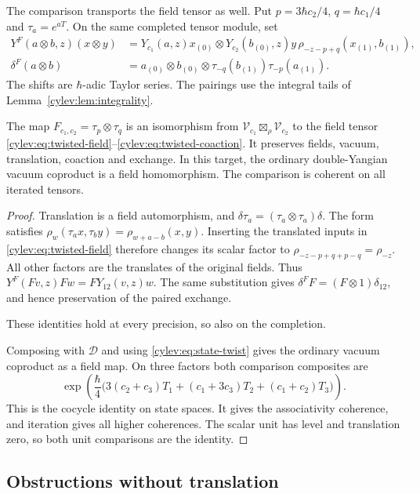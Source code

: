 The comparison transports the field tensor as well.
Put $p=3\hbar c_2/4$, $q=\hbar c_1/4$ and $\tau_a=e^{aT}$.
On the same completed tensor module, set
\begin{align}
 Y^F(a\otimes b,z)(x\otimes y)
 &=Y_{c_1}(a,z)x_{(0)}\otimes Y_{c_2}(b_{(0)},z)y\,
       \rho_{-z-p+q}(x_{(1)},b_{(1)}),\label{cylev:eq:twisted-field}\\
 \delta^F(a\otimes b)
 &=a_{(0)}\otimes b_{(0)}\otimes
          \tau_{-q}(b_{(1)})\tau_{-p}(a_{(1)}).
       \label{cylev:eq:twisted-coaction}
\end{align}
The shifts are $\hbar$-adic Taylor series.
The pairings use the integral tails of Lemma~\ref{cylev:lem:integrality}.

\begin{proposition}\label{cylev:prop:transported-tensor}
The map $F_{c_1,c_2}=\tau_p\otimes\tau_q$ is an isomorphism
from $\mathcal V_{c_1}\boxtimes_\rho\mathcal V_{c_2}$ to the
field tensor \eqref{cylev:eq:twisted-field}--\eqref{cylev:eq:twisted-coaction}.
It preserves fields, vacuum, translation, coaction and exchange.
In this target, the ordinary double-Yangian vacuum coproduct is a
field homomorphism. The comparison is coherent on all iterated tensors.
\end{proposition}
\begin{proof}
Translation is a field automorphism, and
$\delta\tau_a=(\tau_a\otimes\tau_a)\delta$.
The form satisfies
$\rho_w(\tau_a x,\tau_b y)=\rho_{w+a-b}(x,y)$.
Inserting the translated inputs in \eqref{cylev:eq:twisted-field}
therefore changes its scalar factor to
$\rho_{-z-p+q+p-q}=\rho_{-z}$.
All other factors are the translates of the original fields.
Thus $Y^F(Fv,z)Fw=FY_{12}(v,z)w$.
The same substitution gives $\delta^FF=(F\otimes1)\delta_{12}$,
and hence preservation of the paired exchange.

These identities hold at every precision, so also on the completion.

Composing with $\mathscr D$ and using \eqref{cylev:eq:state-twist}
gives the ordinary vacuum coproduct as a field map.
On three factors both comparison composites are
\[
 \exp\!\left(\frac{\hbar}{4}
  \bigl(3(c_2+c_3)T_1+(c_1+3c_3)T_2+(c_1+c_2)T_3\bigr)\right).
\]
This is the cocycle identity on state spaces.
It gives the associativity coherence, and iteration gives all higher
coherences. The scalar unit has level and translation zero, so both
unit comparisons are the identity.
\end{proof}

\subsection{Obstructions without translation}

